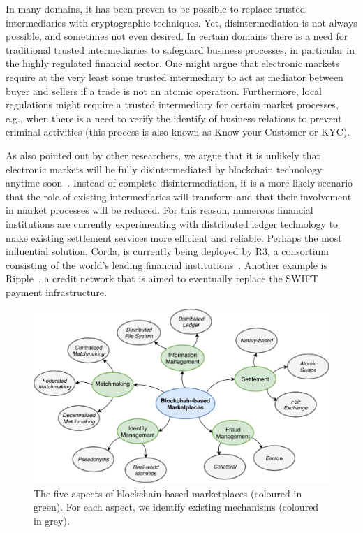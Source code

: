 In many domains, it has been proven to be possible to replace trusted intermediaries with cryptographic techniques.
Yet, disintermediation is not always possible, and sometimes not even desired.
In certain domains there is a need for traditional trusted intermediaries to safeguard business processes, in particular in the highly regulated financial sector.
One might argue that electronic markets require at the very least some trusted intermediary to act as mediator between buyer and sellers if a trade is not an atomic operation.
Furthermore, local regulations might require a trusted intermediary for certain market processes, e.g., when there is a need to verify the identify of business relations to prevent criminal activities (this process is also known as Know-your-Customer or KYC).

As also pointed out by other researchers, we argue that it is unlikely that electronic markets will be fully disintermediated by blockchain technology anytime soon~\cite{zamani2018little}.
Instead of complete disintermediation, it is a more likely scenario that the role of existing intermediaries will transform and that their involvement in market processes will be reduced.
For this reason, numerous financial institutions are currently experimenting with distributed ledger technology to make existing settlement services more efficient and reliable.
Perhaps the most influential solution, Corda, is currently being deployed by R3, a consortium consisting of the world's leading financial institutions~\cite{brown2016introducing}.
Another example is Ripple~\cite{armknecht2015ripple}, a credit network that is aimed to eventually replace the SWIFT payment infrastructure.

\begin{figure}[t]
	\centering
	\includegraphics[width=\linewidth]{introduction/assets/decomposition}
	\caption{The five aspects of blockchain-based marketplaces (coloured in green). For each aspect, we identify existing mechanisms (coloured in grey).}
	\label{fig:electronic_markets}
\end{figure}

